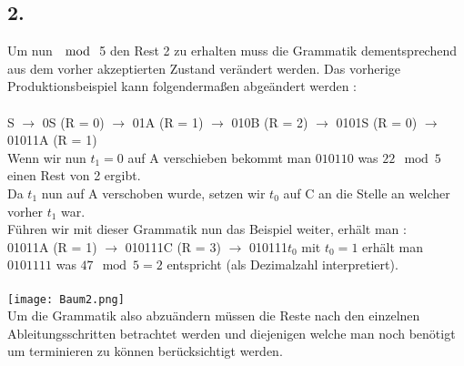 \documentclass[11pt]{article}
\theoremstyle{definition}
\theoremstyle{remark}
\begin{document}
    \subsection*{2.}
    \begin{normalsize}
    	
    	Um nun $\mod$ 5 den Rest 2 zu erhalten muss die Grammatik dementsprechend aus dem vorher akzeptierten Zustand verändert werden. 
    	Das vorherige Produktionsbeispiel kann folgendermaßen abgeändert werden : \\
    	\\
    	S $\rightarrow$ 0S (R = 0) $\rightarrow$ 01A (R = 1) $\rightarrow$ 010B (R = 2) $\rightarrow$ 0101S (R = 0) $\rightarrow$ 01011A (R = 1) \\
    	Wenn wir nun $t_1 = 0$ auf A verschieben bekommt man $010110$ was $22\mod5$ einen Rest von 2 ergibt. \\
    	Da $t_1$ nun auf A verschoben wurde, setzen wir $t_0$ auf C an die Stelle an welcher vorher $t_1$ war.  \\ 
    	Führen wir mit dieser Grammatik nun das Beispiel weiter, erhält man : \\
    	01011A (R = 1) $\rightarrow$ 010111C (R = 3) $\rightarrow$ 010111$t_0$ mit $t_0 = 1$ erhält man $0101111$ was $47\mod5 = 2$ entspricht (als Dezimalzahl interpretiert). \\
    	\\
    	\texttt{[image: Baum2.png]}
    	\\
    	Um die Grammatik also abzuändern müssen die Reste nach den einzelnen Ableitungsschritten betrachtet werden und diejenigen welche man noch benötigt um terminieren zu können berücksichtigt werden. \\
    
    \end{normalsize}
\end{document}
